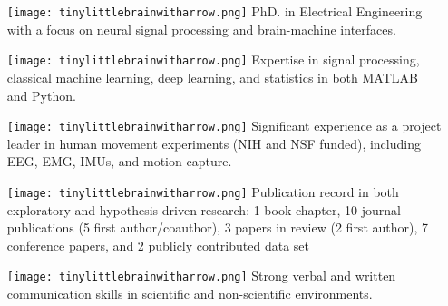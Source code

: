     \begin{adjustwidth}{0.5em}{0pt}
    \begin{itemize}
        \item[\texttt{[image: tinylittlebrainwitharrow.png]}] PhD. in Electrical Engineering with a focus on neural signal processing and brain-machine interfaces.
        \item[\texttt{[image: tinylittlebrainwitharrow.png]}] Expertise in signal processing, classical machine learning, deep learning, and statistics in both MATLAB and Python.
        \item[\texttt{[image: tinylittlebrainwitharrow.png]}] Significant experience as a project leader in human movement experiments (NIH and NSF funded), including EEG, EMG, IMUs, and motion capture. 
        \item[\texttt{[image: tinylittlebrainwitharrow.png]}] Publication record in both exploratory and hypothesis-driven research: 1 book chapter, 10 journal publications (5 first author/coauthor), 3 papers in review (2 first author), 7 conference papers, and 2 publicly contributed data set
        \item[\texttt{[image: tinylittlebrainwitharrow.png]}] Strong verbal and written communication skills in scientific and non-scientific environments.
    \end{itemize}
    \end{adjustwidth}